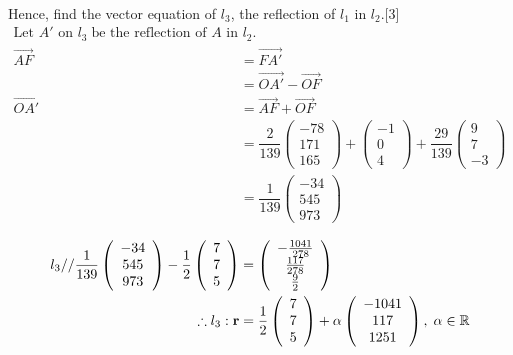 \documentclass[12pt, a4 paper]{article}
\begin{document}
\begin{outline}[enumerate]
\begin{align*}
					\end{align*}
					\color{black}
					\2 Hence, find the vector equation of ${l_3}$, the reflection of ${l_1}$ in ${l_2}$.\hfill[3]
					\color{blue}
					\begin{align*}
						{\textrm{Let }}A'{\textrm{ on }}{l_3}\;{\textrm{be the reflection of }}A{\textrm{ in }}{l_2}. \\\overrightarrow {AF}  &= \overrightarrow {FA'} \\ &= \overrightarrow {OA'}  - \overrightarrow {OF}\\\overrightarrow {OA'}  &= \overrightarrow {AF}  + \overrightarrow {OF} \\ &= \dfrac{2}{{139}}\left( {\begin{array}{*{20}{c}}{ - 78}\\{171}\\{165}\end{array}} \right) + \left( {\begin{array}{*{20}{c}}{ - 1}\\0\\4\end{array}} \right) + \dfrac{{29}}{{139}}\left( {\begin{array}{*{20}{c}}9\\7\\{ - 3}\end{array}} \right)\\ &= \dfrac{1}{{139}}\left( {\begin{array}{*{20}{c}}{ - 34}\\{545}\\{973}\end{array}} \right) \\\end{align*}\begin{align*}{l_3}{\textrm{//}}\dfrac{1}{{139}}\left( {\begin{array}{*{20}{c}}{ - 34}\\{545}\\{973}\end{array}} \right) - \dfrac{1}{2}\left( {\begin{array}{*{20}{c}}7\\7\\5\end{array}} \right) &= \left( {\begin{array}{*{20}{c}}{ - \frac{{1041}}{{278}}}\\{\frac{{117}}{{278}}}\\{\frac{9}{2}}\end{array}} \right)\\\therefore {l_3}:{\bf{r}} &= \dfrac{1}{2}\left( {\begin{array}{*{20}{c}}7\\7\\5\end{array}} \right) + \alpha \left( {\begin{array}{*{20}{c}}{ - 1041}\\{117}\\{1251}\end{array}} \right),\;\alpha  \in \mathbb{R}
					\end{align*}
																								

\end{outline}
\end{document}
